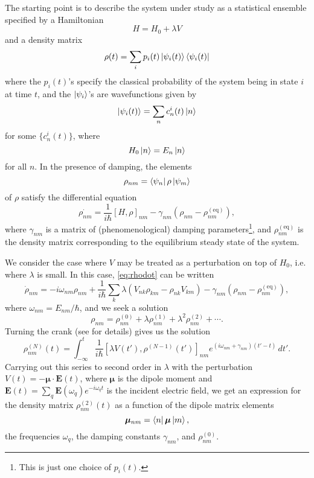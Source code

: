 The starting point is to describe the system under study as a statistical ensemble specified by a Hamiltonian
\begin{equation}
H = H_0+\lambda V
\end{equation}
and a density matrix
\begin{equation}
\rho(t) = \sum_i p_i(t) \ket{\psi_i(t)}\bra{\psi_i(t)}
\end{equation}
where the $p_i(t)$'s specify the classical probability of the system being in state $i$ at time $t$, and the $\ket{\psi_i}$'s are wavefunctions given by
\begin{equation}
\ket{\psi_i(t)} = \sum_n c_n^i(t) \ket{n}
\end{equation}
for some $\{c_n^i(t)\}$, where
\begin{equation}
H_0\ket{n} = E_n \ket{n}
\end{equation}
for all $n$.
In the presence of damping, the elements
\begin{equation}
\rho_{nm} = \bra{\psi_n}\rho\ket{\psi_m}
\end{equation}
of $\rho$ satisfy the differential equation
\begin{equation}\label{eq:rhodot}
\dot{\rho_{nm}} = \frac{1}{i\hbar}[H, \rho]_{nm}-\gamma_{nm}(\rho_{nm}-\rho_{nm}^\mathrm{(eq)}),
\end{equation}
where $\gamma_{nm}$ is a matrix of (phenomenological) damping parameters\footnote{This is just one choice of $p_i(t)$.}, and $\rho_{nm}^\mathrm{(eq)}$ is the density matrix corresponding to the equilibrium steady state of the system.

We consider the case where $V$ may be treated as a perturbation on top of $H_0$, i.e. where $\lambda$ is small.
In this case, \cref{eq:rhodot} can be written
\begin{equation}
\dot{\rho}_{nm} = -i \omega_{nm} \rho_{nm}+\frac{1}{i\hbar}\sum_k \lambda(V_{nk}\rho_{km}-\rho_{nk}V_{km})-\gamma_{nm}(\rho_{nm}-\rho_{nm}^\mathrm{(eq)}),
\end{equation}
where $\omega_{nm}=E_{nm}/\hbar$, and we seek a solution
\begin{equation}
\rho_{nm}=\rho_{nm}^{(0)}+\lambda\rho_{nm}^{(1)}+\lambda^2\rho_{nm}^{(2)}+\cdots.
\end{equation}
Turning the crank (see  for details) gives us the solution
\begin{equation}
\rho_{nm}^{(N)}(t) = \int_{-\infty}^t \frac{1}{i\hbar}[\lambda V(t'), \rho^{(N-1)}(t')]_{nm}e^{(i\omega_{nm}+\gamma_{nm})(t'-t)} \, dt'.
\end{equation}
Carrying out this series to second order in $\lambda$ with the perturbation $V(t)=-\bm{\mu}\cdot\bm{E}(t)$, where $\bm{\mu}$ is the dipole moment and $\bm{E}(t) = \sum_q\bm{E}(\omega_q)e^{-i\omega_q t}$ is the incident electric field, we get an expression for the density matrix $\rho_{nm}^{(2)}(t)$ as a function of the dipole matrix elements
\begin{equation}
\bm{\mu}_{nm} = \bra{n}\bm{\mu}\ket{m},
\end{equation}
the frequencies $\omega_q$, the damping constants $\gamma_{nm}$, and $\rho_{nm}^{(0)}$.

